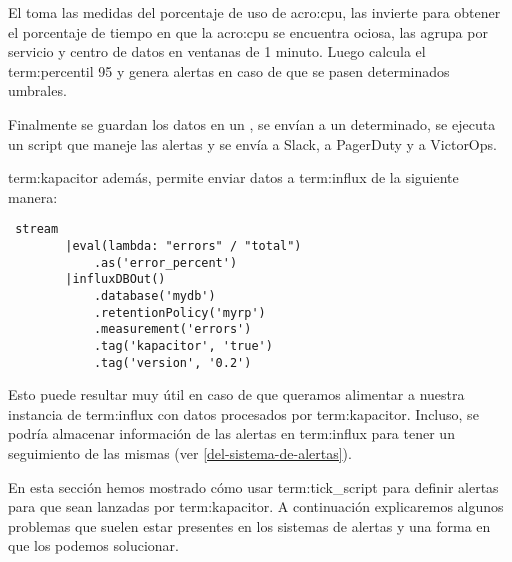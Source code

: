 El  toma las medidas del porcentaje de uso de \gls{acro:cpu}, las
invierte para obtener el porcentaje de tiempo en que la \gls{acro:cpu} se
encuentra ociosa, las agrupa por servicio y centro de datos en ventanas de 1
minuto. Luego calcula el \gls{term:percentil} 95 y genera alertas en caso de
que se pasen determinados umbrales.

Finalmente se guardan los datos en un , se envían a un 
determinado, se ejecuta un script que maneje las alertas y se envía a Slack, a
PagerDuty y a VictorOps.

\gls{term:kapacitor} además, permite enviar datos a \gls{term:influx} de la
siguiente manera:

\begin{lstlisting}
 stream
        |eval(lambda: "errors" / "total")
            .as('error_percent')
        |influxDBOut()
            .database('mydb')
            .retentionPolicy('myrp')
            .measurement('errors')
            .tag('kapacitor', 'true')
            .tag('version', '0.2')
\end{lstlisting}


Esto puede resultar muy útil en caso de que queramos alimentar a nuestra
instancia de \gls{term:influx} con datos procesados por \gls{term:kapacitor}.
Incluso, se podría almacenar información de las alertas en \gls{term:influx}
para tener un seguimiento de las mismas (ver \autoref{del-sistema-de-alertas}).

En esta sección hemos mostrado cómo usar \gls{term:tick_script} para definir
alertas para que sean lanzadas por \gls{term:kapacitor}. A continuación
explicaremos algunos problemas que suelen estar presentes en los sistemas de
alertas y una forma en que los podemos solucionar.
